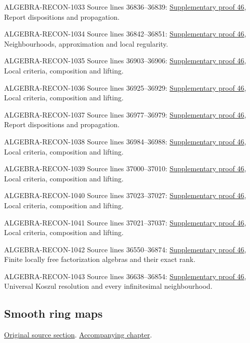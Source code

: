 \begin{AlgebraSourceRoutes}
\item[ALGEBRA-RECON-1033] Source lines 36836--36839: \hyperlink{algebra_syntomic_notes_20260928}{Supplementary proof 46}, Report dispositions and propagation.
\item[ALGEBRA-RECON-1034] Source lines 36842--36851: \hyperlink{algebra_syntomic_notes_20260928}{Supplementary proof 46}, Neighbourhoods, approximation and local regularity.
\item[ALGEBRA-RECON-1035] Source lines 36903--36906: \hyperlink{algebra_syntomic_notes_20260928}{Supplementary proof 46}, Local criteria, composition and lifting.
\item[ALGEBRA-RECON-1036] Source lines 36925--36929: \hyperlink{algebra_syntomic_notes_20260928}{Supplementary proof 46}, Local criteria, composition and lifting.
\item[ALGEBRA-RECON-1037] Source lines 36977--36979: \hyperlink{algebra_syntomic_notes_20260928}{Supplementary proof 46}, Report dispositions and propagation.
\item[ALGEBRA-RECON-1038] Source lines 36984--36988: \hyperlink{algebra_syntomic_notes_20260928}{Supplementary proof 46}, Local criteria, composition and lifting.
\item[ALGEBRA-RECON-1039] Source lines 37000--37010: \hyperlink{algebra_syntomic_notes_20260928}{Supplementary proof 46}, Local criteria, composition and lifting.
\item[ALGEBRA-RECON-1040] Source lines 37023--37027: \hyperlink{algebra_syntomic_notes_20260928}{Supplementary proof 46}, Local criteria, composition and lifting.
\item[ALGEBRA-RECON-1041] Source lines 37021--37037: \hyperlink{algebra_syntomic_notes_20260928}{Supplementary proof 46}, Local criteria, composition and lifting.
\item[ALGEBRA-RECON-1042] Source lines 36550--36874: \hyperlink{algebra_syntomic_notes_20260928}{Supplementary proof 46}, Finite locally free factorization algebras and their exact rank.
\item[ALGEBRA-RECON-1043] Source lines 36638--36854: \hyperlink{algebra_syntomic_notes_20260928}{Supplementary proof 46}, Universal Koszul resolution and every infinitesimal neighbourhood.
\end{AlgebraSourceRoutes}

\subsection{Smooth ring maps}
\hypertarget{algebra-source-section-smooth}{}
\noindent\href{https://github.com/stacks/stacks-project/blob/a04446e57ec1fbc252a871afcec7752fb2807b14/algebra.tex\#L37055}{Original source section}. \href{algebra.pdf\#nameddest=section-smooth}{Accompanying chapter}.


